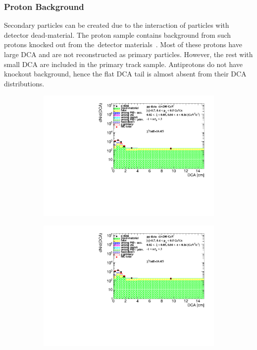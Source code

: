 \subsubsection{Proton Background}\label{section:star_background_proton}
Secondary particles can be created due to the interaction of particles with detector dead-material.
The proton sample contains background from such protons knocked out  from the~detector materials~\cite{STAR:spectra}. Most of these protons have large $\textrm{DCA}$ and are not reconstructed as primary particles. However, the rest with small $\textrm{DCA}$  are included in the primary track sample. Antiprotons do not have knockout background, hence the flat $\textrm{DCA}$ tail is almost absent from their $\textrm{DCA}$ distributions.

\begin{figure}[h!]
	\centering
	\begin{subfigure}{.49\textwidth}
		\includegraphics[width=\linewidth, page=1]{chapters/chrgSTAR/img/DCAproton/background_p_0.pdf}
	\end{subfigure}
	\begin{subfigure}{.49\textwidth}
		\includegraphics[width=\linewidth, page=2]{chapters/chrgSTAR/img/DCAproton/background_p_0.pdf}

\end{subfigure}
\end{figure}
